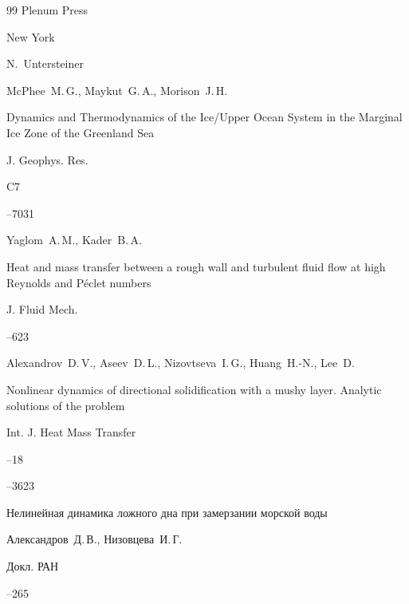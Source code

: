\begin{thebibliography}{99}
\publ Plenum Press

\publaddr New York

\ed N.~Untersteiner




\by McPhee~M.\,G., Maykut~G.\,A., Morison~J.\,H.

\paper Dynamics and Thermodynamics of the Ice/Upper Ocean System in the Marginal Ice Zone of the Greenland Sea

\jour J. Geophys. Res.



\issue C7

--7031




\by Yaglom~A.\,M., Kader~B.\,A.

\paper Heat and mass transfer between a rough wall and turbulent fluid flow at high Reynolds and P{\'e}clet numbers

\jour J. Fluid Mech.




--623




\by Alexandrov~D.\,V., Aseev~D.\,L., Nizovtseva~I.\,G., Huang~H.-N., Lee~D.

\paper Nonlinear dynamics of directional solidification with a mushy layer. Analytic solutions of the problem

\jour Int. J. Heat Mass Transfer



--18

--3623




\paper Нелинейная динамика ложного дна при замерзании морской воды

\by Александров~Д.\,В., Низовцева~И.\,Г.

\jour Докл. РАН




--265


\end{thebibliography}
